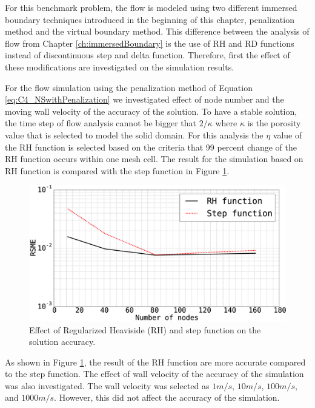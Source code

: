 For this benchmark problem, the flow is modeled using two different immersed boundary techniques introduced in the beginning of this chapter, penalization method and the virtual boundary method. This difference between the analysis of flow from Chapter \ref{ch:immersedBoundary} is the use of RH and RD functions instead of discontinuous step and delta function. Therefore, first the effect of these modifications are investigated on the simulation results.

For the flow simulation using the penalization method of Equation \eqref{eq:C4_NSwithPenalization} we investigated effect of node number and the moving wall velocity of the accuracy of the solution. To have a stable solution, the time step of flow analysis cannot be bigger that $2 / \kappa$ where $\kappa$ is the porosity value that is selected to model the solid domain. For this analysis the $\eta$ value of the RH function is selected based on the criteria that 99 percent change of the RH function occurs within one mesh cell. The result for the simulation based on RH function is compared with the step function in Figure \ref{fig:C4_effectOfRHfunctionOnSimulationResults1Dproblem}.

\begin{figure}[H]
	\centering
	\includegraphics[width=12.00cm]{Chapter_4/figure/effect_of_RH_on_simulation_vs_numberOfNodes_1D_problem.eps}
	\caption{Effect of Regularized Heaviside (RH) and step function on the solution accuracy.}
	\label{fig:C4_effectOfRHfunctionOnSimulationResults1Dproblem}
\end{figure}

As shown in Figure \ref{fig:C4_effectOfRHfunctionOnSimulationResults1Dproblem}, the result of the RH function are more accurate compared to the step function. The effect of wall velocity of the accuracy of the simulation was also investigated. The wall velocity was selected as $1 m/s$, $10 m/s$, $100 m/s$, and $1000 m/s$. However, this did not affect the accuracy of the simulation.

